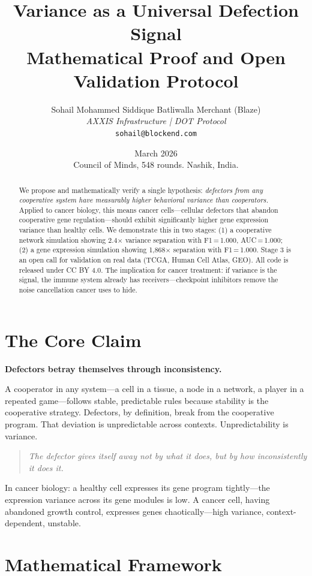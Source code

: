 \documentclass[12pt, letterpaper]{article}
\title{\textbf{Variance as a Universal Defection Signal}\\
\large Mathematical Proof and Open Validation Protocol}
\author{
    Sohail Mohammed Siddique Batliwalla Merchant (Blaze)\\
    \textit{AXXIS Infrastructure | DOT Protocol}\\
    \texttt{sohail@blockend.com}
}
\date{March 2026\\
\small Council of Minds, 548 rounds. Nashik, India.}
\begin{document}
\maketitle

\begin{abstract}
We propose and mathematically verify a single hypothesis: \textit{defectors from any cooperative system have measurably higher behavioral variance than cooperators.} Applied to cancer biology, this means cancer cells---cellular defectors that abandon cooperative gene regulation---should exhibit significantly higher gene expression variance than healthy cells. We demonstrate this in two stages: (1) a cooperative network simulation showing 2.4$\times$ variance separation with F1\,=\,1.000, AUC\,=\,1.000; (2) a gene expression simulation showing 1,868$\times$ separation with F1\,=\,1.000. Stage 3 is an open call for validation on real data (TCGA, Human Cell Atlas, GEO). All code is released under CC BY 4.0. The implication for cancer treatment: if variance is the signal, the immune system already has receivers---checkpoint inhibitors remove the noise cancellation cancer uses to hide.
\end{abstract}

\section{The Core Claim}

\textbf{Defectors betray themselves through inconsistency.}

A cooperator in any system---a cell in a tissue, a node in a network, a player in a repeated game---follows stable, predictable rules because stability is the cooperative strategy. Defectors, by definition, break from the cooperative program. That deviation is unpredictable across contexts. Unpredictability is variance.

\begin{quote}
\textit{The defector gives itself away not by what it does, but by how inconsistently it does it.}
\end{quote}

In cancer biology: a healthy cell expresses its gene program tightly---the expression variance across its gene modules is low. A cancer cell, having abandoned growth control, expresses genes chaotically---high variance, context-dependent, unstable.

\section{Mathematical Framework}
\end{document}
